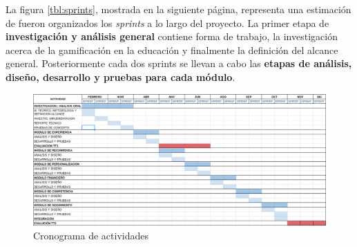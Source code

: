  \noindent
 La figura \ref{tbl:sprints}, mostrada en la siguiente página, representa una estimación de fueron
 organizados los {\it sprints} a lo largo del proyecto. La primer etapa de {\bf investigación
 y análisis general} contiene forma de trabajo, la investigación acerca de la gamificación en la educación
 y finalmente la definición del alcance general. Posteriormente cada dos sprints se llevan a cabo las {\bf
 etapas de análisis, diseño, desarrollo y pruebas para cada módulo}. \clearpage

    \begin{figure}
        \centering
        \includegraphics[width=1\textwidth]{analisis/diagrams/cronograma}
        \caption{Cronograma de actividades}
        \label{fig:awesome_image}
    \end{figure}


